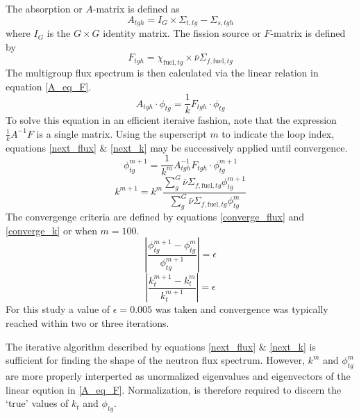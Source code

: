 The absorption or $A$-matrix is defined as 
\begin{equation}
\label{A_matrix}
A_{tgh} = I_G \times \Sigma_{t,tg} - \Sigma_{s,tgh}
\end{equation}
where $I_G$ is the $G \times G$ identity matrix. The fission source or $F$-matrix is defined by
\begin{equation}
\label{F_matrix}
F_{tgh} = \chi_{\mbox{fuel},tg} \times \bar{\nu} \Sigma_{f,\mbox{fuel},tg}
\end{equation}
The multigroup flux spectrum is then calculated via the linear relation in equation \ref{A_eq_F}.
\begin{equation}
\label{A_eq_F}
A_{tgh} \cdot \phi_{tg} = \frac{1}{k} F_{tgh} \cdot \phi_{tg}
\end{equation}
To solve this equation in an efficient iteraive fashion, note that the expression 
$\frac{1}{k}A^{-1}F$ is a single matrix.  Using the superscript $m$ to indicate the loop
index, equations \ref{next_flux} \& \ref{next_k} may be successively applied 
until convergence.
\begin{equation}
\label{next_flux}
\phi_{tg}^{m+1} = \frac{1}{k^m} A_{tgh}^{-1} F_{tgh} \cdot \phi_{tg}^{m+1}
\end{equation}
\begin{equation}
\label{next_k}
k^{m+1} = k^m  \frac{\sum_g^G \bar{\nu} \Sigma_{f,\mbox{fuel},tg} \phi_{tg}^{m+1}}
                         {\sum_g^G \bar{\nu} \Sigma_{f,\mbox{fuel},tg} \phi_{tg}^m}
\end{equation}
The convergenge criteria are defined by equations \ref{converge_flux} and \ref{converge_k}
or when $m=100$.
\begin{equation}
\label{converge_flux}
\left|\frac{\phi_{tg}^{m+1} - \phi_{tg}^m}{\phi_{tg}^{m+1}}\right| = \epsilon
\end{equation}
\begin{equation}
\label{converge_k}
\left|\frac{k_t^{m+1} - k_t^m}{k_t^{m+1}}\right| = \epsilon
\end{equation}
For this study a value of $\epsilon=0.005$ was taken and convergence was typically 
reached within two or three iterations.

The iterative algorithm described by equations \ref{next_flux} \& \ref{next_k} is 
sufficient for finding the shape of the neutron flux spectrum.  However, $k^m$ and 
$\phi_{tg}^m$ are more properly interperted as unormalized eigenvalues and eigenvectors
of the linear eqution in \ref{A_eq_F}.  Normalization, is therefore required to 
discern the `true' values of  $k_t$ and $\phi_{tg}$.


